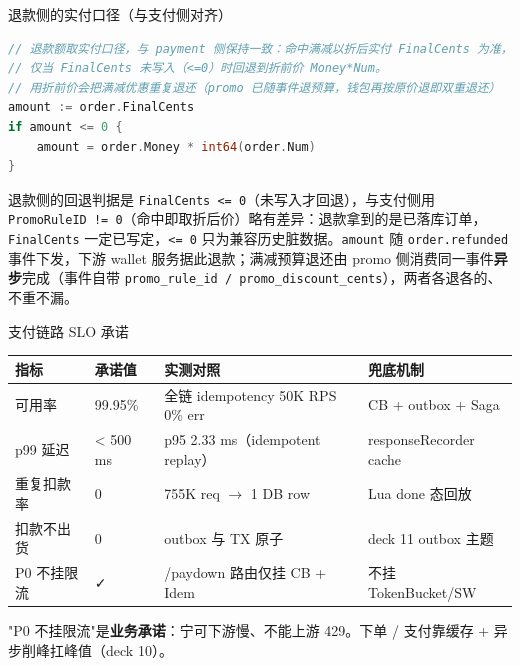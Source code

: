 \documentclass[aspectratio=169,11pt]{beamer}
\begin{document}
\begin{frame}{退款侧的实付口径（与支付侧对齐）}
\begin{lstlisting}[language=Go,firstnumber=106,
  caption={}]
// 退款额取实付口径，与 payment 侧保持一致：命中满减以折后实付 FinalCents 为准，
// 仅当 FinalCents 未写入（<=0）时回退到折前价 Money*Num。
// 用折前价会把满减优惠重复退还（promo 已随事件退预算，钱包再按原价退即双重退还）
amount := order.FinalCents
if amount <= 0 {
    amount = order.Money * int64(order.Num)
}
\end{lstlisting}
\vspace{1mm}
\small 退款侧的回退判据是 \texttt{FinalCents <= 0}（未写入才回退），与支付侧用 \texttt{PromoRuleID != 0}（命中即取折后价）略有差异：退款拿到的是已落库订单，\texttt{FinalCents} 一定已写定，\texttt{<= 0} 只为兼容历史脏数据。\texttt{amount} 随 \texttt{order.refunded} 事件下发，下游 wallet 服务据此退款；满减预算退还由 promo 侧消费同一事件\textbf{异步}完成（事件自带 \texttt{promo\_rule\_id / promo\_discount\_cents}），两者各退各的、不重不漏。
\end{frame}

\begin{frame}[shrink]{支付链路 SLO 承诺}
\small
\begin{tabular}{@{}llll@{}}
\toprule
指标 & 承诺值 & 实测对照 & 兜底机制 \\
\midrule
可用率 & 99.95\% & 全链 idempotency 50K RPS 0\% err & CB + outbox + Saga \\
p99 延迟 & < 500 ms & p95 2.33 ms（idempotent replay） & responseRecorder cache \\
重复扣款率 & 0 & 755K req $\to$ 1 DB row & Lua done 态回放 \\
扣款不出货 & 0 & outbox 与 TX 原子 & deck 11 outbox 主题 \\
P0 不挂限流 & ✓ & /paydown 路由仅挂 CB + Idem & 不挂 TokenBucket/SW \\
\bottomrule
\end{tabular}
\vspace{2mm}
\small "P0 不挂限流"是\textbf{业务承诺}：宁可下游慢、不能上游 429。下单 / 支付靠缓存 + 异步削峰扛峰值（deck 10）。
\end{frame}
\end{document}
